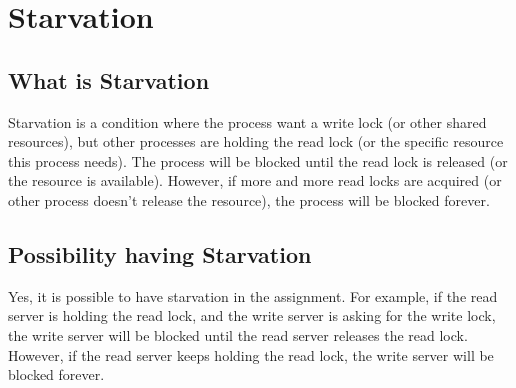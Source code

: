 \section{Starvation}

\subsection{What is Starvation}

Starvation is a condition where the process want a write lock (or other shared resources), but other processes are holding the read lock (or the specific resource this process needs). The process will be blocked until the read lock is released (or the resource is available). However, if more and more read locks are acquired (or other process doesn't release the resource), the process will be blocked forever.

\subsection{Possibility having Starvation}

Yes, it is possible to have starvation in the assignment. For example, if the read server is holding the read lock, and the write server is asking for the write lock, the write server will be blocked until the read server releases the read lock. However, if the read server keeps holding the read lock, the write server will be blocked forever.